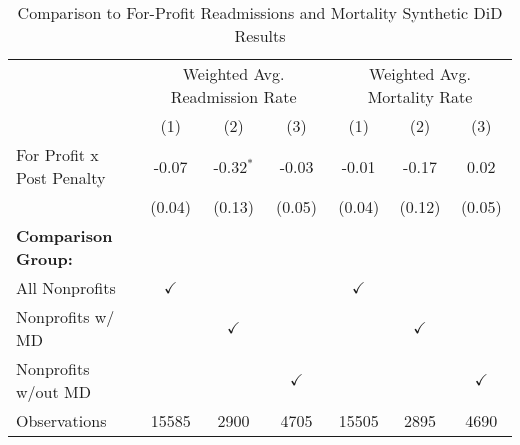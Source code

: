 \begin{table}[ht!]

\caption{\label{tab:forprofit_synth} Comparison to For-Profit Readmissions and Mortality Synthetic DiD Results}
\centering
\begin{tabular}[t]{lcccccc}
\toprule
\multicolumn{1}{c}{ } & \multicolumn{3}{c}{Weighted Avg. Readmission Rate} & \multicolumn{3}{c}{Weighted Avg. Mortality Rate} \\
\cmidrule(l{3pt}r{3pt}){2-4} \cmidrule(l{3pt}r{3pt}){5-7}
 & (1) & (2) & (3) & (1) & (2) & (3)\\
\midrule
For Profit x Post Penalty & -0.07 & -0.32$^{*}$ & -0.03 & -0.01 & -0.17 & 0.02\\
 & (0.04) & (0.13) & (0.05) & (0.04) & (0.12) & (0.05)\\
\textbf{Comparison Group:} &  &  &  &  &  & \\
All Nonprofits & $\checkmark$ &  &  & $\checkmark$ &  & \\
Nonprofits w/ MD &  & $\checkmark$ &  &  & $\checkmark$ & \\
\addlinespace
Nonprofits w/out MD &  &  & $\checkmark$ &  &  & $\checkmark$\\
Observations & 15585 & 2900 & 4705 & 15505 & 2895 & 4690\\
\bottomrule
\end{tabular}
\end{table}
